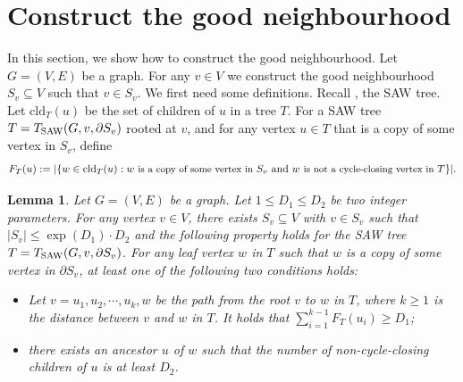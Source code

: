\documentclass[11pt]{amsart}
\newcommand{\defeq}{:=}
\newtheorem{lemma}[theorem]{Lemma}
\theoremstyle{definition}
\newtheorem{definition}[theorem]{Definition}
\theoremstyle{remark}
\begin{document}
\section{Construct the good neighbourhood}\label{sec:construct-region}
In this section, we show how to construct the good neighbourhood.
Let $G=(V,E)$ be a graph.
For any $v\in V$ we construct the good neighbourhood $S_v\subseteq V$ such that $v\in S_v$.
We first need some definitions.
%
Recall , the SAW tree.
Let $\text{cld}_T(u)$ be the set of children of $u$ in a tree $T$. For a SAW tree $T = T_{\textnormal{SAW}}(G,v,\partial S_v)$ rooted at $v$, and for any vertex $u\in T$ that is a copy of some vertex in $S_v$, define 
\begin{align}\label{eq:F_T}
F_T(u):=|\{w\in \text{cld}_T(u): w \text{ \small is a copy of some vertex in } S_v \text{ and } w \text{ \small is not a cycle-closing vertex in } T\}|.
\end{align}

\begin{lemma}\label{lemma:saw-tree-construction-nonsimple}
Let $G=(V,E)$ be a graph.  
Let $1 \leq D_1 \leq D_2$ be two integer parameters.
For any vertex $v\in V$, there exists $S_v\subseteq V$ with $v\in S_v$ such that $|S_v| \leq \exp(D_1)\cdot D_2$ and the following property holds for the SAW tree $T = T_{\textnormal{SAW}}(G,v,\partial S_v)$.  
For any leaf vertex $w$ in $T$ such that $w$ is a copy of some vertex in $\partial S_v$, at least one of the following two conditions holds:
\begin{itemize}
\item Let $v = u_1,u_2,\cdots,u_k,w$ be the path from the root $v$ to $w$ in $T$, where $k \geq 1$ is the distance between $v$ and $w$ in $T$. It holds that $\sum_{i=1}^{k-1} F_T(u_i) \geq D_1$;
\item there exists an ancestor $u$ of $w$ such that the number of non-cycle-closing children of $u$ is at least $D_2$. 
\end{itemize}
\end{lemma}
\end{document}
